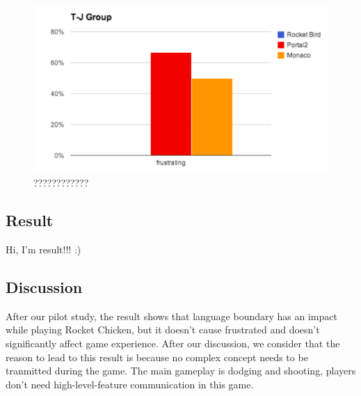 \begin{figure}[!h]
\centering
\includegraphics[width=0.9\columnwidth]{Figures/PS_F1.png}
\caption{????????????}
\label{fig:figure1}
\end{figure}


\subsection{Result}

Hi, I'm result!!! :)


\subsection{Discussion}

After our pilot study, the result shows that language boundary has an impact while playing Rocket Chicken, but it doesn't cause frustrated and doesn't significantly affect game experience. After our discussion, we consider that the reason to lead to this result is because no complex concept needs to be tranmitted during the game. The main gameplay is dodging and shooting, players don't need high-level-feature communication in this game.


